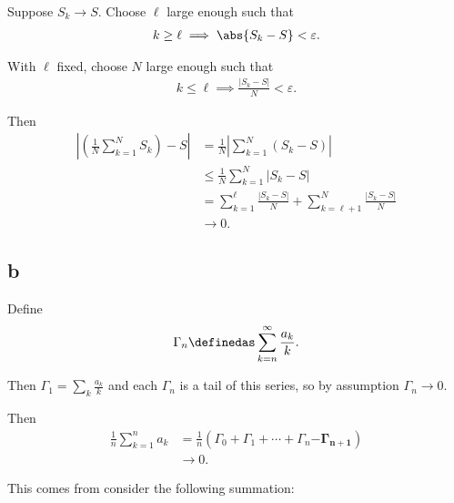 Suppose \(S_k \to S\). Choose \(\ell\) large enough such that
\begin{align*}
k\geq \ell \implies \abs{S_k - S} < \varepsilon
.\end{align*}

With \(\ell\) fixed, choose \(N\) large enough such that
\begin{align*}
k\leq \ell \implies \frac{\left|S_{k}-S\right|}{N} < \varepsilon
.\end{align*}

Then \begin{align*}
\left|\left(\frac{1}{N} \sum_{k=1}^{N} S_{k}\right)-S\right| 
&=\frac{1}{N}\left|\sum_{k=1}^{N}\left(S_{k}-S\right)\right| \\
&\leq \frac{1}{N} \sum_{k=1}^{N}\left|S_{k}-S\right| \\
&= \sum_{k=1}^{\ell}\frac{\left|S_{k}-S\right|}{N} +
\sum_{k=\ell+1}^{N} \frac{\left|S_{k}-S\right|}{N} \\
& \to 0
.\end{align*}

\hypertarget{b}{%
\subsection{b}\label{b}}

Define \begin{align*}
\Gamma_n \definedas \sum_{k=n}^\infty \frac{a_k}{k}
.\end{align*}

Then \(\Gamma_1 = \sum_k \frac{ a_k } k\) and each \(\Gamma_n\) is a
tail of this series, so by assumption \(\Gamma_n \to 0\).

Then \begin{align*}
\frac 1 n \sum_{k=1}^n a_k 
&= \frac 1 n (\Gamma_0 + \Gamma_1 + \cdots + \Gamma_{n} \mathbf{- \Gamma_{n+1}}) \\
&\to 0
.\end{align*}

This comes from consider the following summation:


